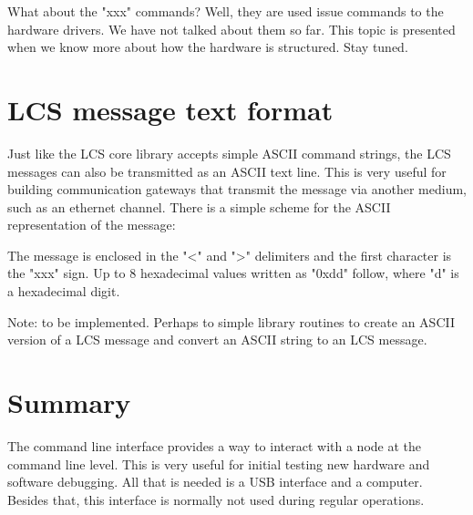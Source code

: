 What about the "xxx" commands? Well, they are used issue commands to the hardware drivers. We have not talked about them so far. This topic is presented when we know more about how the hardware is structured. Stay tuned.

\section{LCS message text format}

Just like the LCS core library accepts simple ASCII command strings, the LCS messages can also be transmitted as an ASCII text line. This is very useful for building communication gateways that transmit the message via another medium, such as an ethernet channel. There is a simple scheme for the ASCII representation of the message:

%

The message is enclosed in the "<" and ">" delimiters and the first character is the "xxx" sign. Up to 8 hexadecimal values written as "0xdd" follow, where "d" is a hexadecimal digit.



Note: to be implemented. Perhaps to simple library routines to create an ASCII version of a LCS message and convert an ASCII string to an LCS message.

\section{Summary}

The command line interface provides a way to interact with a node at the command line level. This is very useful for initial testing new hardware and software debugging. All that is needed is a USB interface and a computer. Besides that, this interface is normally not used during regular operations.